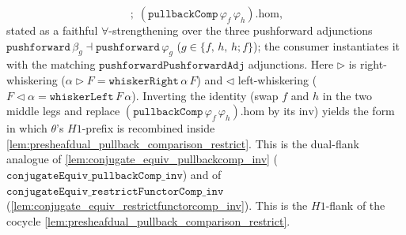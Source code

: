 \begin{lemma}
\[        \;\mathbin{;}\; (\mathtt{pullbackComp}\,\varphi_f\,\varphi_h).\mathrm{hom} ,
  \]
  stated as a faithful \(\forall\)-strengthening over the three pushforward adjunctions
  \(\mathtt{pushforward}\,\beta_g \dashv \mathtt{pushforward}\,\varphi_g\)
  (\(g \in \{f,\, h,\, h\mathbin{;}f\}\)); the consumer instantiates it with the matching
  \(\mathtt{pushforwardPushforwardAdj}\) adjunctions. Here \(\triangleright\) is right-whiskering
  (\(\alpha \triangleright F = \mathtt{whiskerRight}\,\alpha\,F\)) and \(\triangleleft\) left-whiskering
  (\(F \triangleleft \alpha = \mathtt{whiskerLeft}\,F\,\alpha\)). Inverting the identity (swap \(f\)
  and \(h\) in the two middle legs and replace \((\mathtt{pullbackComp}\,\varphi_f\,\varphi_h).\mathrm{hom}\)
  by its \(\mathrm{inv}\)) yields the form in which \(\theta\)'s \(H1\)-prefix is recombined inside
  \cref{lem:presheafdual_pullback_comparison_restrict}.
  This is the dual-flank analogue of \cref{lem:conjugate_equiv_pullbackcomp_inv}
  (\(\mathtt{conjugateEquiv\_pullbackComp\_inv}\)) and of
  \(\mathtt{conjugateEquiv\_restrictFunctorComp\_inv}\)
  (\cref{lem:conjugate_equiv_restrictfunctorcomp_inv}). This is the \(H1\)-flank of the cocycle
  \cref{lem:presheafdual_pullback_comparison_restrict}.
\end{lemma}
